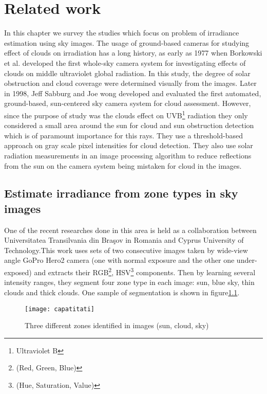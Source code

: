 \chapter{Related work}
\label{sec:related_work_chapter}
In this chapter we survey the studies which focus on problem of irradiance estimation using sky images. The usage of ground-based cameras for studying effect of clouds on irradiation has a long history, as early as 1977 when Borkowski et al.\cite{Borkowski1977} developed the first whole-sky camera system for investigating effects of clouds on middle ultraviolet global radiation. In this study, the degree of solar obstruction and cloud coverage were determined visually from the images. Later in 1998, Jeff Sabburg and Joe wong\cite{Sabburg1998} developed and evaluated the first automated, ground-based, sun-centered sky camera system for cloud assessment. However, since the purpose of study was the clouds effect on UVB\footnote{Ultraviolet B} radiation they only considered a small area around the sun for cloud and sun obstruction detection which is of paramount importance for this rays. They use a threshold-based approach on gray scale pixel intensities for cloud detection. They also use solar radiation measurements in an image processing algorithm to reduce reflections from the sun on the camera system being mistaken for cloud in the images.

\section{Estimate irradiance from zone types in sky images}
One of the recent researches done in this area is held as a collaboration between Universitatea Transilvania din Braşov in Romania and Cyprus University of Technology\cite{romania_paper}\cite{romania_report}.This work uses sets of two consecutive images taken by wide-view angle GoPro Hero2 camera (one with normal exposure and the other one under-exposed) and extracts their RGB\footnote{(Red, Green, Blue)}, HSV\footnote{(Hue, Saturation, Value)} components. Then by learning several intensity ranges, they segment four zone type in each image: sun, blue sky, thin clouds and thick clouds. One sample of segmentation is shown in figure\ref{fig:capatitati}.

\begin{figure}[h]
\caption{Three different zones identified in images (sun, cloud, sky)}
\label{fig:capatitati}
\texttt{[image: capatitati]}
\centering
\end{figure} 

